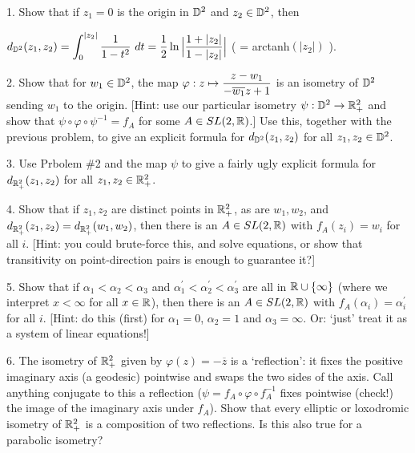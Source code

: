 \documentclass[12pt]{article}
\begin{document}
\begin{description}

\item{1.} Show that if $z_1=0$ is the origin in ${\mathbb D}^2$ and $z_2\in{\mathbb D}^2$, then 

\hfill
$\dsp\ddd(z_1,z_2)=\int_0^{|z_2|}\frac{1}{1-t^2}\ dt=\frac{1}{2}\ln\Big|\frac{1+|z_2|}{1-|z_2|}\Big|$
( = arctanh$(|z_2|)$ ).

\msk

\item{2.} Show that for $w_1\in{\mathbb D}^2$, the map $\displaystyle \varphi:z\mapsto \frac {z-w_1}{-\overline{w_1}z+1}$
is an isometry of ${\mathbb D}^2$ sending $w_1$ to the origin. [Hint: use our particular isometry
$\psi:{\mathbb D}^2\rightarrow{\mathbb R}^2_+$ and show that $\psi\circ\varphi\circ\psi^{-1}=f_A$ for some $A\in SL(2,{\mathbb R})$.]
Use this, together with the previous problem,
to give an explicit formula for $d_{{\mathbb D}^2}(z_1,z_2)$ for all $z_1,z_2\in{\mathbb D}^2$. 

\msk

\item{3.} Use Prbolem \#2 and the map $\psi$ to give a fairly ugly explicit formula for 
$d_{{\mathbb R}^2_+}(z_1,z_2)$ for all $z_1,z_2\in{\mathbb R}^2_+$.

\msk


\item{4.} Show that if $z_1,z_2$ are distinct points in ${\mathbb R}^2_+$, as are
$w_1,w_2$, and $d_{{\mathbb R}^2_+}(z_1,z_2)=d_{{\mathbb R}^2_+}(w_1,w_2)$, then there is an $A\in SL(2,{\mathbb R})$
with $f_A(z_i)=w_i$ for all $i$. [Hint: you could brute-force this, and solve 
equations, or show that transitivity on point-direction pairs is enough to 
guarantee it?]

\msk

\item{5.} Show that if $\alpha_1<\alpha_2<\alpha_3$ and 
$\alpha_1^\prime<\alpha_2^\prime<\alpha_3^\prime$
are all in ${\mathbb R}\cup\{\infty\}$ (where we interpret $x<\infty$ for all $x\in{\mathbb R}$),
then there is an $A\in SL(2,{\mathbb R})$ with $f_A(\alpha_i)=\alpha_i^\prime$ for all $i$.
[Hint: do this (first) for $\alpha_1=0$, $\alpha_2=1$ and $\alpha_3=\infty$. Or: `just'
treat it as a system of linear equations!]

\msk

\item{6.} The isometry of ${\mathbb R}^2_+$ given by $\varphi(z)= -\overline{z}$ is a `reflection': it fixes the 
positive imaginary axis (a geodesic) pointwise and swaps the two sides of the axis. Call anything
conjugate to this a reflection ($\psi=f_A\circ\varphi\circ f_A^{-1}$ fixes pointwise (check!) the image
of the imaginary axis under $f_A$). Show that every elliptic or loxodromic isometry of ${\mathbb R}^2_+$ is a 
composition of two reflections. Is this also true for a parabolic isometry?


\end{description}
\end{document}
